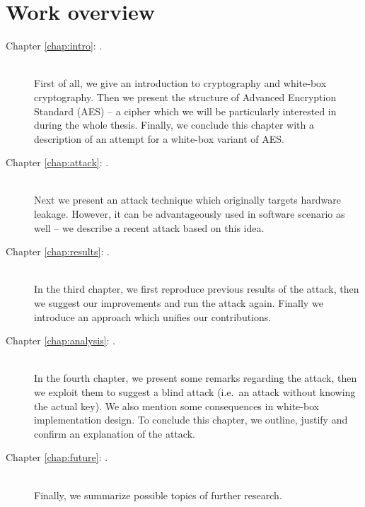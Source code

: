 \section*{Work overview}
	\begin{description}
		\item[Chapter \ref{chap:intro}: .] ~ \\
			First of all, we give an introduction to cryptography and white-box cryptography. Then we present the structure of Advanced Encryption Standard (AES) -- a cipher which we will be particularly interested in during the whole thesis. Finally, we conclude this chapter with a description of an attempt for a white-box variant of AES.
		\item[Chapter \ref{chap:attack}: .] ~ \\
			Next we present an attack technique which originally targets hardware leakage. However, it can be advantageously used in software scenario as well -- we describe a recent attack based on this idea.
		\item[Chapter \ref{chap:results}: .] ~ \\
			In the third chapter, we first reproduce previous results of the attack, then we suggest our improvements and run the attack again. Finally we introduce an approach which unifies our contributions.
		\item[Chapter \ref{chap:analysis}: .] ~ \\
			In the fourth chapter, we present some remarks regarding the attack, then we exploit them to suggest a blind attack (i.e.\ an attack without knowing the actual key). We also mention some consequences in white-box implementation design. To conclude this chapter, we outline, justify and confirm an explanation of the attack.
		\item[Chapter \ref{chap:future}: .] ~ \\
			Finally, we summarize possible topics of further research.
	\end{description}

